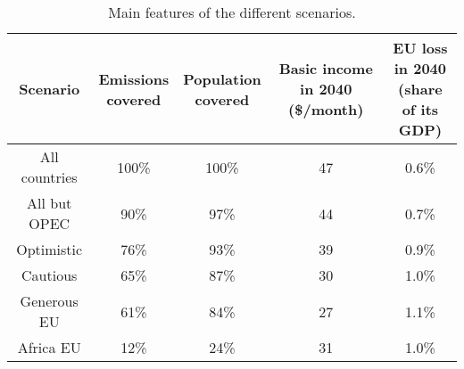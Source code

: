 \begin{table}[h]

\caption{\label{tab:scenarios_table.tex}Main features of the different scenarios.}
\centering
\begin{tabular}[t]{ccccc}
\toprule
Scenario & \makecell{Emissions\\covered} & \makecell{Population\\covered} & \makecell{Basic income\\in 2040 (\$/month)} & \makecell{EU loss in 2040\\(share of its GDP)}\\
\midrule
All countries & 100\% & 100\% & 47 & 0.6\%\\
All but OPEC & 90\% & 97\% & 44 & 0.7\%\\
Optimistic & 76\% & 93\% & 39 & 0.9\%\\
Cautious & 65\% & 87\% & 30 & 1.0\%\\
Generous EU & 61\% & 84\% & 27 & 1.1\%\\
Africa EU & 12\% & 24\% & 31 & 1.0\%\\
\bottomrule
\end{tabular}
\end{table}